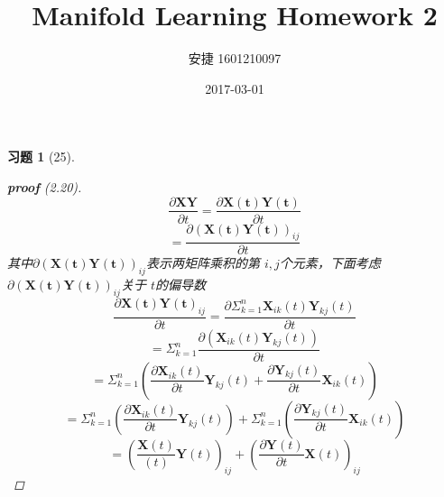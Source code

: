 \documentclass[a4paper, UTF8]{ctexart}
\title{Manifold Learning Homework 2}
\date{2017-03-01}
\author{安捷 1601210097}
\newtheorem*{exercise}{\textbf{习题}}
\begin{document}
\maketitle
  \begin{exercise}[25]
    \begin{proof}[\textbf{proof} (2.20)]
      \begin{equation*}
        \frac{\partial \mathbf{XY}}{\partial t} = \frac{\partial \mathbf{X \left(t\right)}\mathbf{Y \left(t\right)}}{\partial t}
      \end{equation*}
      \begin{equation*}
        = \frac{ \partial \left( \mathbf{X \left( t \right) Y \left( t \right)} \right)_{ij} }{\partial t}
      \end{equation*}
      其中$\partial \left( \mathbf{X \left( t \right) Y \left( t \right)} \right)_{ij}$表示两矩阵乘积的第 $i,j$个元素，下面考虑$\partial \left( \mathbf{X \left( t \right) Y \left( t \right)} \right)_{ij}$关于 $t$的偏导数
      \begin{equation*}
        \frac{\partial \mathbf{X \left( t \right) Y \left( t \right)}_{ij} }{\partial t} = \frac{\partial \Sigma_{k=1}^n \mathbf{X}_{ik} \left( t \right)\mathbf{Y}_{kj} \left( t \right)}{\partial t}
      \end{equation*}
      \begin{equation*}
        = \Sigma_{k=1}^n \frac{\partial \left( \mathbf{X}_{ik}\left( t \right)\mathbf{Y}_{kj}\left( t \right) \right)}{\partial t}
      \end{equation*}
      \begin{equation*}
        = \Sigma_{k=1}^n\left( \frac{\partial\mathbf{X}_{ik}\left(t\right)}{\partial t}\mathbf{Y}_{kj}\left( t \right) + \frac{\partial \mathbf{Y}_{kj}\left( t \right)}{\partial t}\mathbf{X}_{ik}\left( t \right)\right)
      \end{equation*}
      \begin{equation*}
        = \Sigma_{k=1}^n \left( \frac{\partial \mathbf{X}_{ik} \left( t \right) }{\partial t}\mathbf{Y}_{kj}\left( t \right) \right) + \Sigma_{k=1}^n \left( \frac{\partial \mathbf{Y}_{kj}\left( t \right)}{\partial t} \mathbf{X}_{ik}\left( t \right)\right)
      \end{equation*}
      \begin{equation*}
        = \left( \frac{\mathbf{X}\left( t \right)}{\left( t \right)}\mathbf{Y} \left( t \right)\right)_{ij} + \left( \frac{\partial \mathbf{Y}\left( t \right)}{\partial t }\mathbf{X}\left( t \right)\right)_{ij}

\end{equation*}
\end{proof}
\end{exercise}
\end{document}
